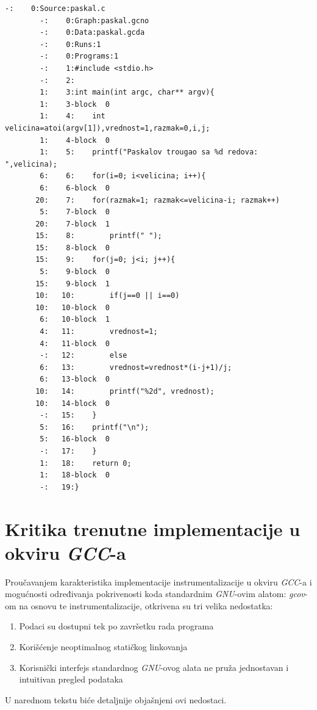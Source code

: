 \documentclass[12pt,oneside]{memoir}
\newcommand{\strano}[1]{\textit{#1}}
\begin{document}
\newpage
\begin{lstlisting}[caption={Primer izveštaja koji generiše alat \strano{gcov} sa opcijom -a},frame=single, label=block]
        -:    0:Source:paskal.c
        -:    0:Graph:paskal.gcno
        -:    0:Data:paskal.gcda
        -:    0:Runs:1
        -:    0:Programs:1
        -:    1:#include <stdio.h>
        -:    2:
        1:    3:int main(int argc, char** argv){
        1:    3-block  0
        1:    4:    int velicina=atoi(argv[1]),vrednost=1,razmak=0,i,j;
        1:    4-block  0
        1:    5:    printf("Paskalov trougao sa %d redova: ",velicina);
        6:    6:    for(i=0; i<velicina; i++){
        6:    6-block  0
       20:    7:	for(razmak=1; razmak<=velicina-i; razmak++)
        5:    7-block  0
       20:    7-block  1
       15:    8:	    printf(" ");
       15:    8-block  0
       15:    9:	for(j=0; j<i; j++){
        5:    9-block  0
       15:    9-block  1
       10:   10:	    if(j==0 || i==0)
       10:   10-block  0
        6:   10-block  1
        4:   11:		vrednost=1;
        4:   11-block  0
        -:   12:	    else
        6:   13:		vrednost=vrednost*(i-j+1)/j;
        6:   13-block  0
       10:   14:	    printf("%2d", vrednost);
       10:   14-block  0
        -:   15:	}
        5:   16:	printf("\n");
        5:   16-block  0
        -:   17:    }
        1:   18:    return 0;
        1:   18-block  0
        -:   19:}
\end{lstlisting}

\section{Kritika trenutne implementacije u okviru \strano{GCC}-a }


Proučavanjem karakteristika implementacije instrumentalizacije u okviru \strano{GCC}-a i mogućnosti određivanja pokrivenosti koda standardnim \strano{GNU}-ovim alatom: \strano{gcov}-om na osnovu te instrumentalizacije, otkrivena su tri velika nedostatka:

\begin{enumerate}
\item Podaci su dostupni tek po završetku rada programa
\item Korišćenje neoptimalnog statičkog linkovanja
\item Korisnički interfejs standardnog \strano{GNU}-ovog alata ne pruža jednostavan i intuitivan pregled podataka
\end{enumerate}

U narednom tekstu biće detaljnije objašnjeni ovi nedostaci.
\end{document}
